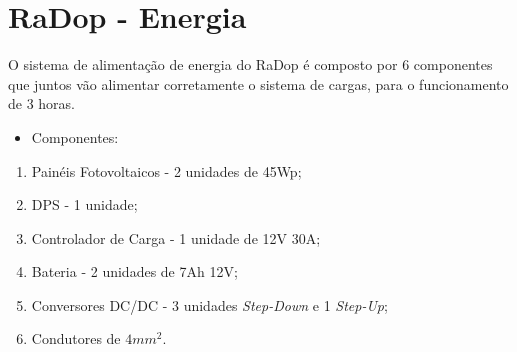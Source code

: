 \begin{enumerate}
            
            

     
%         
     

     
             
        \end{enumerate}
            
             \section{RaDop - Energia}
             
O sistema de alimentação de energia do RaDop é composto por 6 componentes que juntos vão alimentar corretamente o sistema de cargas, para o funcionamento de 3 horas.

             \begin{itemize}
                 \item Componentes:
             \end{itemize}
             \begin{enumerate}
                 
             \item Painéis Fotovoltaicos - 2 unidades de 45Wp;
             
             \item DPS - 1 unidade;
             \item Controlador de Carga - 1 unidade de 12V 30A;
             
             \item Bateria - 2 unidades de 7Ah 12V;
             
             \item Conversores DC/DC - 3 unidades \emph{Step-Down} e 1 \emph{Step-Up};
             
             \item Condutores de $4mm^2$.
             \end{enumerate}
             
